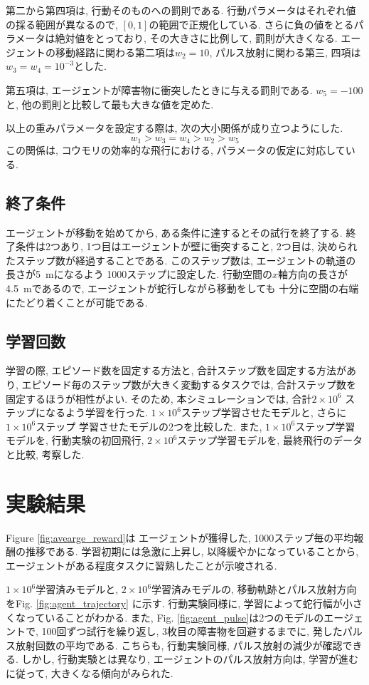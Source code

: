 \documentclass[../main]{subfiles}
\begin{document}
第二から第四項は, 行動そのものへの罰則である.
行動パラメータはそれぞれ値の採る範囲が異なるので, 
$[0, 1]$の範囲で正規化している.
さらに負の値をとるパラメータは絶対値をとっており, 
その大きさに比例して, 罰則が大きくなる.
エージェントの移動経路に関わる第二項は$w_2=10$, 
パルス放射に関わる第三, 四項は$w_3=w_4=10^{-3}$とした. 

第五項は, エージェントが障害物に衝突したときに与える罰則である.
$w_5=-100$と, 他の罰則と比較して最も大きな値を定めた.

以上の重みパラメータを設定する際は, 
次の大小関係が成り立つようにした.
$$
w_1>w_3=w_4>w_2>w_5
$$
この関係は, コウモリの効率的な飛行における, 
パラメータの仮定に対応している.


\subsection{終了条件}
エージェントが移動を始めてから, 
ある条件に達するとその試行を終了する.
終了条件は2つあり, 1つ目はエージェントが壁に衝突すること, 
2つ目は, 決められたステップ数が経過することである.
このステップ数は, エージェントの軌道の長さが\SI{5}{\metre}になるよう
1000ステップに設定した. 
行動空間の$x$軸方向の長さが\SI{4.5}{\metre}であるので, 
エージェントが蛇行しながら移動をしても
十分に空間の右端にたどり着くことが可能である.


\subsection{学習回数}
学習の際, エピソード数を固定する方法と, 
合計ステップ数を固定する方法があり, 
エピソード毎のステップ数が大きく変動するタスクでは, 
合計ステップ数を固定するほうが相性がよい.
そのため, 本シミュレーションでは, 合計$2\times 10^6$
ステップになるよう学習を行った.
$1\times 10^6$ステップ学習させたモデルと, 
さらに$1\times 10^6$ステップ
学習させたモデルの2つを比較した.
また, $1\times 10^6$ステップ学習モデルを, 
行動実験の初回飛行, 
$2\times 10^6$ステップ学習モデルを, 
最終飛行のデータと比較, 考察した.


\section{実験結果}
Figure \ref{fig:avearge_reward}は
エージェントが獲得した, 
1000ステップ毎の平均報酬の推移である.
学習初期には急激に上昇し, 以降緩やかになっていることから, 
エージェントがある程度タスクに習熟したことが示唆される.

$1\times 10^6$学習済みモデルと, 
$2\times 10^6$学習済みモデルの,
移動軌跡とパルス放射方向をFig. \ref{fig:agent_trajectory}
に示す.
行動実験同様に, 学習によって蛇行幅が小さくなっていることがわかる.
また, Fig. \ref{fig:agent_pulse}は2つのモデルのエージェントで, 
100回ずつ試行を繰り返し, 3枚目の障害物を回避するまでに, 
発したパルス放射回数の平均である.
こちらも, 行動実験同様, パルス放射の減少が確認できる.
しかし, 行動実験とは異なり, エージェントのパルス放射方向は, 
学習が進むに従って, 大きくなる傾向がみられた.
\end{document}
